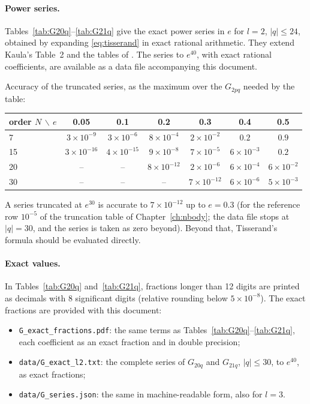 \paragraph{Power series.} Tables~\ref{tab:G20q}--\ref{tab:G21q} give the exact power series in $e$ for $l=2$, $|q|\le24$, obtained by expanding \eqref{eq:tisserand} in exact rational arithmetic. They extend Kaula's Table~2 and the tables of \citet{Cayley1861}. The series to $e^{40}$, with exact rational coefficients, are available as a data file accompanying this document.

Accuracy of the truncated series, as the maximum over the $G_{2pq}$ needed by the table:
\begin{center}
\begin{tabular}{l|cccccc}\toprule
order $N$ $\backslash$ $e$ & 0.05 & 0.1 & 0.2 & 0.3 & 0.4 & 0.5\\\midrule
7 & $3\times10^{-9}$ & $3\times10^{-6}$ & $8\times10^{-4}$ & $2\times10^{-2}$ & $0.2$ & $0.9$\\
15 & $3\times10^{-16}$ & $4\times10^{-15}$ & $9\times10^{-8}$ & $7\times10^{-5}$ & $6\times10^{-3}$ & $0.2$\\
20 & -- & -- & $8\times10^{-12}$ & $2\times10^{-6}$ & $6\times10^{-4}$ & $6\times10^{-2}$\\
30 & -- & -- & -- & $7\times10^{-12}$ & $6\times10^{-6}$ & $5\times10^{-3}$\\\bottomrule
\end{tabular}
\end{center}
A series truncated at $e^{30}$ is accurate to $7\times10^{-12}$ up to $e=0.3$ (for the reference row $10^{-5}$ of the truncation table of Chapter~\ref{ch:nbody}; the data file stops at $|q|=30$, and the series is taken as zero beyond). Beyond that, Tisserand's formula should be evaluated directly.

\paragraph{Exact values.} In Tables~\ref{tab:G20q} and~\ref{tab:G21q}, fractions longer than 12 digits are printed as decimals with 8 significant digits (relative rounding below $5\times10^{-8}$). The exact fractions are provided with this document:
\begin{itemize}
  \item \texttt{G\_exact\_fractions.pdf}: the same terms as Tables~\ref{tab:G20q}--\ref{tab:G21q}, each coefficient as an exact fraction and in double precision;
  \item \texttt{data/G\_exact\_l2.txt}: the complete series of $G_{20q}$ and $G_{21q}$, $|q|\le30$, to $e^{40}$, as exact fractions;
  \item \texttt{data/G\_series.json}: the same in machine-readable form, also for $l=3$.
\end{itemize}

